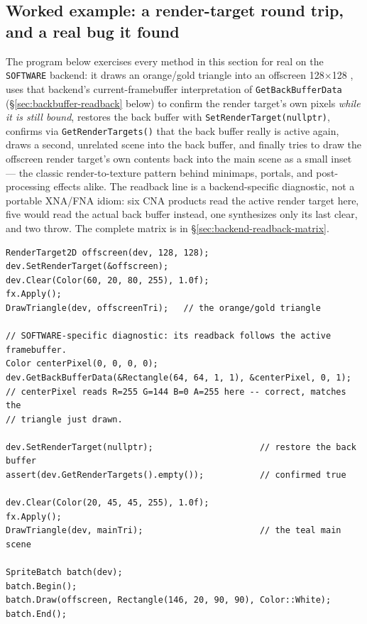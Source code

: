 \subsection{Worked example: a render-target round trip, and a real bug it found}
\label{sec:worked-rendertarget}

The program below exercises every method in this section for real on the \texttt{SOFTWARE}
backend: it draws an orange/gold triangle into an offscreen 128$\times$128
, uses that backend's current-framebuffer interpretation of
\texttt{GetBackBufferData} (\S\ref{sec:backbuffer-readback} below) to confirm the render
target's own pixels \emph{while it is still bound}, restores the back buffer with
\texttt{SetRender\allowbreak Target(nullptr)}, confirms via
\texttt{GetRender\allowbreak Targets()} that the back
buffer really is active again, draws a second, unrelated scene into the back buffer, and
finally tries to draw the offscreen render target's own contents back into the main scene as a
small inset --- the classic render-to-texture pattern behind minimaps, portals, and
post-processing effects alike. The readback line is a backend-specific diagnostic, not a
portable XNA/FNA idiom: six CNA products read the active render target here, five would read
the actual back buffer instead, one synthesizes only its last clear, and two throw. The
complete matrix is in \S\ref{sec:backend-readback-matrix}.

\begin{lstlisting}
RenderTarget2D offscreen(dev, 128, 128);
dev.SetRenderTarget(&offscreen);
dev.Clear(Color(60, 20, 80, 255), 1.0f);
fx.Apply();
DrawTriangle(dev, offscreenTri);   // the orange/gold triangle

// SOFTWARE-specific diagnostic: its readback follows the active framebuffer.
Color centerPixel(0, 0, 0, 0);
dev.GetBackBufferData(&Rectangle(64, 64, 1, 1), &centerPixel, 0, 1);
// centerPixel reads R=255 G=144 B=0 A=255 here -- correct, matches the
// triangle just drawn.

dev.SetRenderTarget(nullptr);                     // restore the back buffer
assert(dev.GetRenderTargets().empty());           // confirmed true

dev.Clear(Color(20, 45, 45, 255), 1.0f);
fx.Apply();
DrawTriangle(dev, mainTri);                       // the teal main scene

SpriteBatch batch(dev);
batch.Begin();
batch.Draw(offscreen, Rectangle(146, 20, 90, 90), Color::White);
batch.End();
\end{lstlisting}

